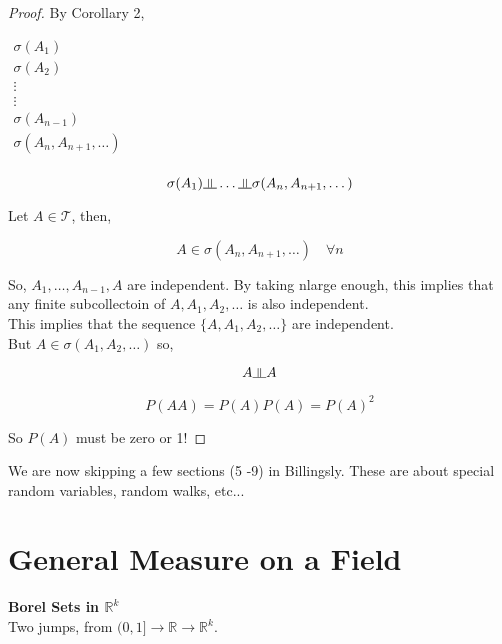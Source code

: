 \documentclass[11pt,fleqn]{book} %
\newcommand{\indep}{\rotatebox[origin=c]{90}{$\models$}}
\begin{document}
\begin{proof}
	By Corollary 2, 

	$\begin{matrix}
		\sigma(A_1)\\
		\sigma(A_2)\\
		\vdots\\
		\vdots\\
		\sigma(A_{n-1})\\
		\sigma(A_n, A_{n+1}, \dots)\\
	\end{matrix}$

	$$\sigma(A_1) \indep \dots \indep \sigma(A_n, A_{n+1}, \dots)$$

	Let $A \in \mathcal{T}$, then,

	$$A \in \sigma(A_n, A_{n+1}, \dots) \quad \forall n$$

	So, $A_1, \dots, A_{n-1}, A$ are independent. By taking nlarge enough, this implies that any  finite subcollectoin of $A, A_1, A_2, \dots$ is also independent. \\

	This implies that the sequence $\{ A, A_1, A_2, \dots\}$ are independent. \\

	But $A \in \sigma(A_1, A_2, \dots)$ so, 

	$$A \indep A$$

	$$ P(AA) = P(A)P(A) = P(A)^2 $$

	So $P(A)$ must be zero or 1! 

\end{proof}

\begin{remark}
	We are now skipping a few sections (5 -9) in Billingsly. These are about special random variables, random walks, etc...
\end{remark}





\section{General Measure on a Field}





\textbf{Borel Sets in $\mathbb{R}^k$}\\

Two jumps, from $(0,1] \rightarrow \mathbb{R} \rightarrow \mathbb{R}^k$.
\end{document}
